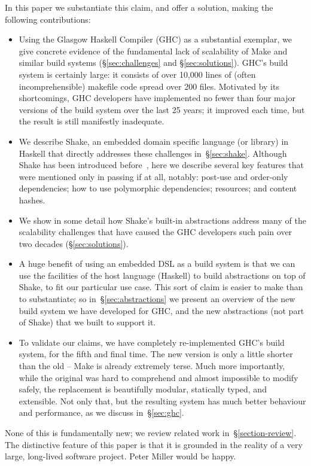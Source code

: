 In this paper we substantiate this claim, and offer a solution,
making the following contributions:
\begin{itemize}
\item Using the Glasgow Haskell Compiler (GHC) as a substantial exemplar,
we give concrete evidence of the fundamental lack of scalability of
Make and similar build systems (\S\ref{sec:challenges} and
\S\ref{sec:solutions}).  GHC's build system is certainly large: it
consists of over 10,000 lines of (often incomprehensible) makefile code
spread over 200 files.  Motivated by its shortcomings, GHC developers have
implemented no fewer than four major versions of the build system over the
last 25 years; it improved each time, but the result is still manifestly inadequate.

\item We describe Shake, an embedded domain specific language (or library)
in Haskell that directly addresses these challenges
in~\S\ref{sec:shake}.
Although Shake has been introduced before~\cite{shake}, here we describe
several key features that were mentioned only in passing if at all, notably:
post-use and order-only dependencies; how to use polymorphic dependencies;
resources; and content hashes.

\item We show in some detail how Shake's built-in abstractions address
many of the scalability challenges that have caused the GHC developers such pain over
two decades (\S\ref{sec:solutions}).

\item A huge benefit of using an embedded DSL as a build system is that
we can use the facilities of the host language (Haskell) to build
abstractions on top of Shake, to fit our particular use case.
This sort of claim is easier to make than to substantiate; so
in~\S\ref{sec:abstractions} we present an overview of the new build system we have
developed for GHC, and the new abstractions (not part of Shake) that we built
to support it.

\item To validate our claims, we have completely re-implemented GHC's
build system, for the fifth and final time.  The new version is
only a little shorter than the old -- Make is already extremely terse.
Much more importantly, while the original was hard to comprehend and
almost impossible to modify safely, the replacement is beautifully
modular, statically typed, and extensible.  Not only that, but the
resulting system has much better behaviour and performance,
as we discuss in~\S\ref{sec:ghc}.
\end{itemize}
None of this is fundamentally new; we review related work
in~\S\ref{section-review}.
The distinctive feature of this paper is that it is grounded in the reality
of a very large, long-lived software project.  Peter Miller would be happy.

